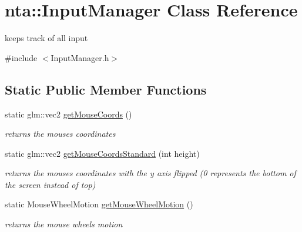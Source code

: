\hypertarget{classnta_1_1InputManager}{}\section{nta\+:\+:Input\+Manager Class Reference}
\label{classnta_1_1InputManager}


keeps track of all input  




{\ttfamily \#include $<$Input\+Manager.\+h$>$}

\subsection*{Static Public Member Functions}
\begin{DoxyCompactItemize}
\item 
\mbox{\label{classnta_1_1InputManager_abaa04adc67f8025133fd1360b171b95f}} 
static glm\+::vec2 \hyperlink{classnta_1_1InputManager_abaa04adc67f8025133fd1360b171b95f}{get\+Mouse\+Coords} ()
\begin{DoxyCompactList}\small\item\em returns the mouse\textquotesingle{}s coordinates \end{DoxyCompactList}\item 
\mbox{\label{classnta_1_1InputManager_a899371ac784e0a1aeb6f9dc1e7f0f58c}} 
static glm\+::vec2 \hyperlink{classnta_1_1InputManager_a899371ac784e0a1aeb6f9dc1e7f0f58c}{get\+Mouse\+Coords\+Standard} (int height)
\begin{DoxyCompactList}\small\item\em returns the mouse\textquotesingle{}s coordinates with the y axis flipped (0 represents the bottom of the screen instead of top) \end{DoxyCompactList}\item 
\mbox{\label{classnta_1_1InputManager_a9f308e79f224806eb923ce2ef0f8023a}} 
static Mouse\+Wheel\+Motion \hyperlink{classnta_1_1InputManager_a9f308e79f224806eb923ce2ef0f8023a}{get\+Mouse\+Wheel\+Motion} ()
\begin{DoxyCompactList}\small\item\em returns the mouse wheel\textquotesingle{}s motion \end{DoxyCompactList}\item 

\end{DoxyCompactItemize}
